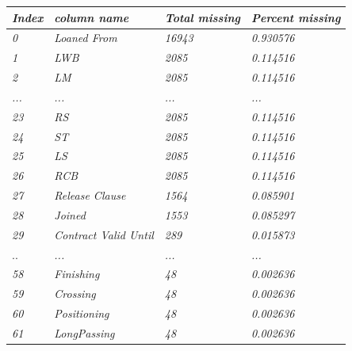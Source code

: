 \documentclass{article}
\begin{document}
\begin{table}[]
\centering
\begin{tabular}{|l|l|l|l|}
\hline
\textit{Index} & \textit{column name}          & \textit{Total missing} & \textit{Percent missing} \\ \hline
\textit{0}     & \textit{Loaned From}          & \textit{16943}         & \textit{0.930576}        \\ \hline
\textit{1}     & \textit{LWB}                  & \textit{2085}          & \textit{0.114516}        \\ \hline
\textit{2}     & \textit{LM}                   & \textit{2085}          & \textit{0.114516}        \\ \hline
\textit{...}   & \textit{...}                  & \textit{...}           & \textit{...}             \\ \hline
\textit{23}    & \textit{RS}                   & \textit{2085}          & \textit{0.114516}        \\ \hline
\textit{24}    & \textit{ST}                   & \textit{2085}          & \textit{0.114516}        \\ \hline
\textit{25}    & \textit{LS}                   & \textit{2085}          & \textit{0.114516}        \\ \hline
\textit{26}    & \textit{RCB}                  & \textit{2085}          & \textit{0.114516}        \\ \hline
\textit{27}    & \textit{Release Clause}       & \textit{1564}          & \textit{0.085901}        \\ \hline
\textit{28}    & \textit{Joined}               & \textit{1553}          & \textit{0.085297}        \\ \hline
\textit{29}    & \textit{Contract Valid Until} & \textit{289}           & \textit{0.015873}        \\ \hline
..             & \textit{...}                  & \textit{...}           & \textit{...}             \\ \hline
\textit{58}    & \textit{Finishing}            & \textit{48}            & \textit{0.002636}        \\ \hline
\textit{59}    & \textit{Crossing}             & \textit{48}            & \textit{0.002636}        \\ \hline
\textit{60}    & \textit{Positioning}          & \textit{48}            & \textit{0.002636}        \\ \hline
\textit{61}    & \textit{LongPassing}          & \textit{48}            & \textit{0.002636}        \\ \hline

\end{tabular}
\end{table}
\end{document}

